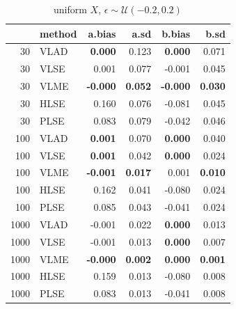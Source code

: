 \documentclass[twoside]{article}
\begin{document}
\begin{table}[ht]
\centering
\caption{uniform $X$, $\epsilon \sim \mathcal{U}(-0.2,0.2)$}
\begin{tabular}{rlrrrr}
  \hline
 & method & a.bias & a.sd & b.bias & b.sd \\ 
  \hline
  30 & VLAD & \textbf{0.000} & 0.123 & \textbf{0.000} & 0.071 \\ 
  30 & VLSE & 0.001 & 0.077 & -0.001 & 0.045 \\ 
  30 & VLME & \textbf{-0.000} & \textbf{0.052} & \textbf{-0.000} & \textbf{0.030} \\ 
  30 & HLSE & 0.160 & 0.076 & -0.081 & 0.045 \\ 
  30 & PLSE & 0.083 & 0.079 & -0.042 & 0.046 \\
  \hline
  100 & VLAD & \textbf{0.001} & 0.070 & \textbf{0.000} & 0.040 \\ 
  100 & VLSE & \textbf{0.001} & 0.042 & \textbf{0.000} & 0.024 \\ 
  100 & VLME & \textbf{-0.001} & \textbf{0.017} & 0.001 & \textbf{0.010} \\ 
  100 & HLSE & 0.162 & 0.041 & -0.080 & 0.024 \\ 
  100 & PLSE & 0.085 & 0.043 & -0.041 & 0.024 \\  
  \hline
  1000 & VLAD & -0.001 & 0.022 & \textbf{0.000} & 0.013 \\ 
  1000 & VLSE & -0.001 & 0.013 & \textbf{0.000} & 0.007 \\ 
  1000 & VLME & \textbf{-0.000} & \textbf{0.002} & \textbf{0.000} & \textbf{0.001} \\ 
  1000 & HLSE & 0.159 & 0.013 & -0.080 & 0.008 \\ 
  1000 & PLSE & 0.083 & 0.013 & -0.041 & 0.008 \\ 
   \hline
\end{tabular}
\end{table}
\end{document}
